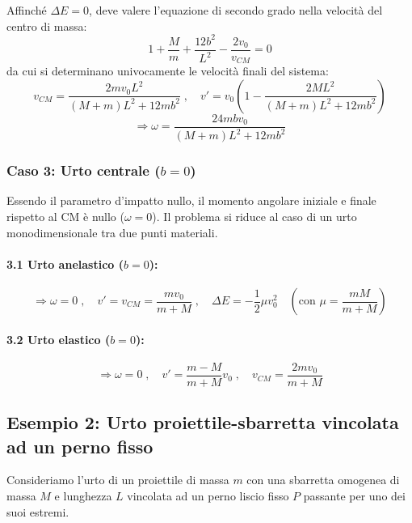 Affinché $\Delta E = 0$, deve valere l'equazione di secondo grado nella velocità del centro di massa:
\begin{equation}
    1 + \frac{M}{m} + \frac{12 b^2}{L^2} - \frac{2 v_0}{v_{CM}} = 0
\end{equation}
da cui si determinano univocamente le velocità finali del sistema:
\begin{equation}
    v_{CM} = \frac{2 m v_0 L^2}{(M+m)L^2 + 12mb^2} \; , \quad v' = v_0 \left( 1 - \frac{2 M L^2}{(M+m)L^2 + 12mb^2} \right)
\end{equation}
\begin{equation}
    \Rightarrow \omega = \frac{24 m b v_0}{(M+m)L^2 + 12mb^2}
\end{equation}

\subsubsection{Caso 3: Urto centrale ($b = 0$)}
Essendo il parametro d'impatto nullo, il momento angolare iniziale e finale rispetto al CM è nullo ($\omega = 0$). Il problema si riduce al caso di un urto monodimensionale tra due punti materiali.
\paragraph{3.1 Urto anelastico ($b=0$):}
\begin{equation}
    \Rightarrow \omega = 0 \; , \quad v' = v_{CM} = \frac{m v_0}{m+M} \; , \quad \Delta E = - \frac{1}{2} \mu v_0^2 \quad \left(\text{con } \mu = \frac{mM}{m+M}\right)
\end{equation}

\paragraph{3.2 Urto elastico ($b=0$):}
\begin{equation}
    \Rightarrow \omega = 0 \; , \quad v' = \frac{m-M}{m+M} v_0 \; , \quad v_{CM} = \frac{2 m v_0}{m+M}
\end{equation}

\subsection{Esempio 2: Urto proiettile-sbarretta vincolata ad un perno fisso}
Consideriamo l'urto di un proiettile di massa $m$ con una sbarretta omogenea di massa $M$ e lunghezza $L$ vincolata ad un perno liscio fisso $P$ passante per uno dei suoi estremi.

